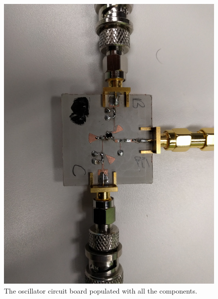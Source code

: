 \documentclass{article}
\begin{document}
\begin{figure}[!htbp]
    \centering
    \includegraphics[scale=0.04]{oscillator.jpg}
    \caption{The oscillator circuit board populated with all the components.}
    \label{fig:oscsetup}
\end{figure}
\end{document}
